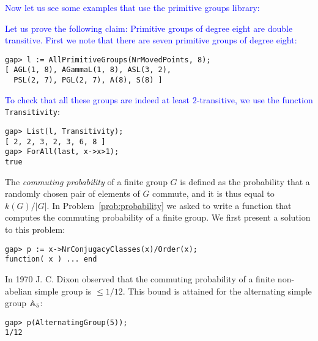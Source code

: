 \textcolor{blue}{
Now let us see some examples that use the primitive groups library:}

\begin{example}
\textcolor{blue}{
Let us prove the following claim: Primitive groups of degree eight are
double transitive. First we note that there are seven primitive groups of
degree eight:}
\begin{lstlisting}
gap> l := AllPrimitiveGroups(NrMovedPoints, 8);
[ AGL(1, 8), AGammaL(1, 8), ASL(3, 2), 
  PSL(2, 7), PGL(2, 7), A(8), S(8) ]
\end{lstlisting}
\textcolor{blue}{
To check that all these groups are indeed at least $2$-transitive, we use the
function} \verb+Transitivity+:
\begin{lstlisting}
gap> List(l, Transitivity);
[ 2, 2, 3, 2, 3, 6, 8 ]
gap> ForAll(last, x->x>1);                 
true
\end{lstlisting}
\end{example}
	
The {\it commuting probability} of a finite group $G$ is defined as the probability
that a randomly chosen pair of elements of $G$ commute, and it is thus equal to
$k(G)/|G|$. In Problem~\ref{prob:probability} we asked to write a function that
computes the commuting probability of a finite group. 
We first present a solution to this problem:

\begin{lstlisting}
gap> p := x->NrConjugacyClasses(x)/Order(x);
function( x ) ... end
\end{lstlisting}

In 1970 J. C. Dixon observed that the commuting probability of a finite
non-abelian simple group is $\leq 1/12$. This bound is attained for the
alternating simple group $\mathbb{A}_5$:

\begin{lstlisting}
gap> p(AlternatingGroup(5));                
1/12
\end{lstlisting}



